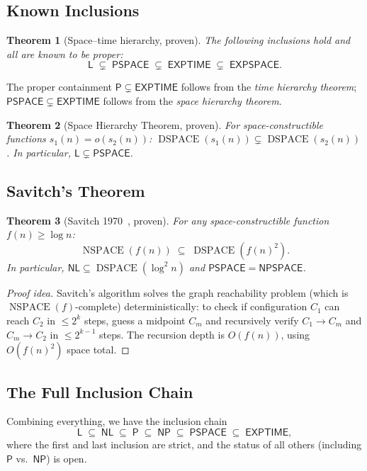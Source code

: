 \documentclass[12pt,a4paper]{amsart}
\newtheorem{theorem}{Theorem}[section]
\theoremstyle{definition}
\newcommand{\Pclass}{\mathsf{P}}
\newcommand{\NP}{\mathsf{NP}}
\newcommand{\PSPACE}{\mathsf{PSPACE}}
\newcommand{\EXPTIME}{\mathsf{EXPTIME}}
\newcommand{\EXPSPACE}{\mathsf{EXPSPACE}}
\newcommand{\Lclass}{\mathsf{L}}
\newcommand{\NL}{\mathsf{NL}}
\DeclareMathOperator{\DSPACE}{DSPACE}
\DeclareMathOperator{\NSPACE}{NSPACE}
\begin{document}
\subsection{Known Inclusions}

\begin{theorem}[Space--time hierarchy, proven]
The following inclusions hold and all are known to be proper:
\[
  \Lclass \;\subsetneq\; \PSPACE \;\subsetneq\; \EXPTIME \;\subsetneq\; \EXPSPACE.
\]
\end{theorem}

The proper containment $\Pclass\subsetneq\EXPTIME$ follows from the
\emph{time hierarchy theorem}; $\PSPACE\subsetneq\EXPTIME$ follows from the
\emph{space hierarchy theorem}.

\begin{theorem}[Space Hierarchy Theorem, proven]
For space-constructible functions $s_1(n) = o(s_2(n))$:
$\DSPACE(s_1(n)) \subsetneq \DSPACE(s_2(n))$.
In particular, $\Lclass \subsetneq \PSPACE$.
\end{theorem}

\subsection{Savitch's Theorem}

\begin{theorem}[Savitch 1970~\cite{savitch1970}, proven]
For any space-constructible function $f(n)\geq\log n$:
\[
  \NSPACE(f(n)) \;\subseteq\; \DSPACE\!\left(f(n)^2\right).
\]
In particular, $\NL\subseteq\DSPACE(\log^2 n)$ and $\PSPACE = \mathsf{NPSPACE}$.
\end{theorem}

\begin{proof}[Proof idea]
Savitch's algorithm solves the graph reachability problem (which is
$\NSPACE(f)$-complete) deterministically: to check if configuration $C_1$ can
reach $C_2$ in $\leq 2^k$ steps, guess a midpoint $C_m$ and recursively verify
$C_1\to C_m$ and $C_m\to C_2$ in $\leq 2^{k-1}$ steps.  The recursion depth is
$O(f(n))$, using $O(f(n)^2)$ space total.
\end{proof}

\subsection{The Full Inclusion Chain}

Combining everything, we have the inclusion chain
\[
  \Lclass \;\subseteq\; \NL \;\subseteq\; \Pclass \;\subseteq\; \NP \;\subseteq\;
  \PSPACE \;\subseteq\; \EXPTIME,
\]
where the first and last inclusion are strict, and the status of all others
(including $\Pclass$ vs.\ $\NP$) is open.
\end{document}
